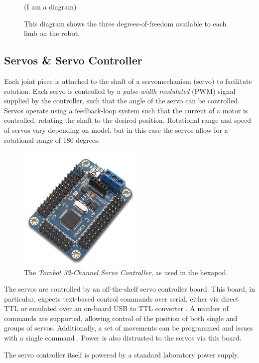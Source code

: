 \documentclass{l4proj}
\begin{document}
\begin{figure}[!h]
    \centering
    (I am a diagram)
    \caption{This diagram shows the three degrees-of-freedom available to each limb on the robot.}
    \label{fig:hexapod_dof}
\end{figure}

\subsection{Servos \& Servo Controller}
Each joint piece is attached to the shaft of a servomechanism (servo) to facilitate rotation. Each servo is controlled by a \emph{pulse-width modulated} (PWM) signal supplied by the controller, such that the angle of the servo can be controlled. Servos operate using a feedback-loop system such that the current of a motor is controlled, rotating the shaft to the desired position. Rotational range and speed of servos vary depending on model, but in this case the servos allow for a rotational range of 180 degrees.

\begin{figure}[!h]
    \centering
    \includegraphics[width=6cm]{torobot_controller}
    \caption{The \emph{Torobot 32-Channel Servo Controller}, as used in the hexapod.}
    \label{fig:torobot_controller}
\end{figure}

The servos are controlled by an off-the-shelf servo controller board. This board, in particular, expects text-based control commands over serial, either via direct TTL or emulated over an on-board USB to TTL converter \cite{torobot_manual}. A number of commands are supported, allowing control of the position of both single and groups of servos. Additionally, a set of movements can be programmed and issues with a single command \cite{torobot_manual}. Power is also distrusted to the servos via this board.

The servo controller itself is powered by a standard laboratory power supply.
\end{document}
